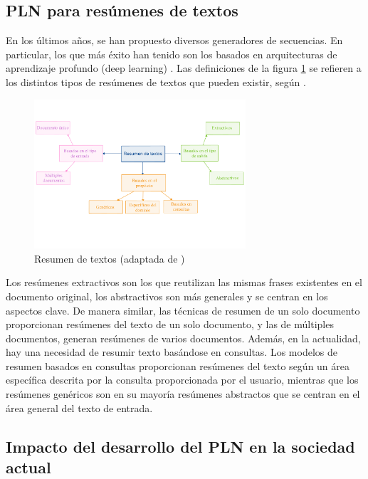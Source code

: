 \subsection{PLN para resúmenes de textos}

En los últimos años, se han propuesto diversos generadores de secuencias. En particular, los que más éxito han tenido son los basados en arquitecturas de aprendizaje profundo (deep learning) \citep{mishra2020deep}. Las definiciones de la figura \ref{fig:resumenTextos} se refieren a los distintos tipos de resúmenes de textos que pueden existir, según \cite{adhikari2020nlp}. 

\begin{figure}[h]
	\centering
	\includegraphics[width = 0.7\textwidth]{Imagenes/Vectorial/resumenTextos.pdf}
	\caption{Resumen de textos (adaptada de \cite{adhikari2020nlp})}
	\label{fig:resumenTextos}
\end{figure}

Los resúmenes extractivos son los que reutilizan las mismas frases existentes en el documento original, los abstractivos son más generales y se centran en los aspectos clave. De manera similar, las técnicas de resumen de un solo documento proporcionan resúmenes del texto de un solo documento, y las de múltiples documentos, generan resúmenes de varios documentos. Además, en la actualidad, hay una necesidad de resumir texto basándose en consultas. Los modelos de resumen basados en consultas proporcionan resúmenes del texto según un área específica descrita por la consulta proporcionada por el usuario, mientras que los resúmenes genéricos son en su mayoría resúmenes abstractos que se centran en el área general del texto de entrada.

\subsection{Impacto del desarrollo del PLN en la sociedad actual}

